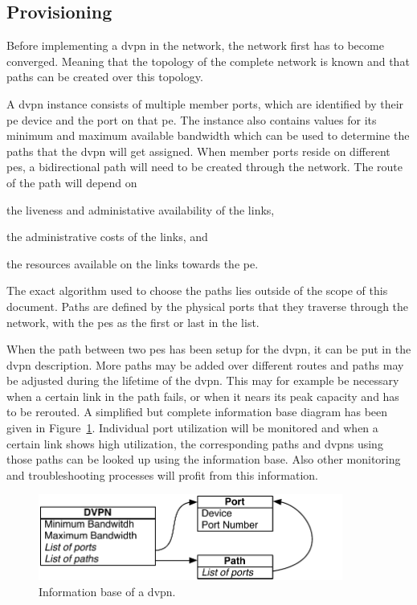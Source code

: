 

\subsection{Provisioning} %
\label{sub:provisioning}

Before implementing a \ac{dvpn} in the network, the network first has to become converged. Meaning that the topology of the complete network is known and that paths can be created over this topology. 

A \ac{dvpn} instance consists of multiple member ports, which are identified by their \ac{pe} device and the port on that \ac{pe}. The instance also contains values for its minimum and maximum available bandwidth which can be used to determine the paths that the \ac{dvpn} will get assigned. When member ports reside on different \acp{pe}, a bidirectional path will need to be created through the network. The route of the path will depend on 
\begin{inparaenum}
	\item the liveness and administative availability of the links, 
	\item the administrative costs of the links, and 
	\item the resources available on the links towards the \ac{pe}.
\end{inparaenum}
The exact algorithm used to choose the paths lies outside of the scope of this document. Paths are defined by the physical ports that they traverse through the network, with the \acp{pe} as the first or last in the list.

When the path between two \acp{pe} has been setup for the \ac{dvpn}, it can be put in the \ac{dvpn} description. More paths may be added over different routes and paths may be adjusted during the lifetime of the \ac{dvpn}. This may for example be necessary when a certain link in the path fails, or when it nears its peak capacity and has to be rerouted. A simplified but complete information base diagram has been given in Figure~\ref{fig:infobase}. Individual port utilization will be monitored and when a certain link shows high utilization, the corresponding paths and \acp{dvpn} using those paths can be looked up using the information base. Also other monitoring and troubleshooting processes will profit from this information.

\begin{figure}[!h]
	\centering
	\includegraphics[width=10cm]{./includes/infobase.pdf}
	\caption{Information base of a \ac{dvpn}.}
	\label{fig:infobase}
\end{figure}

